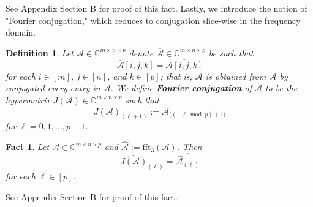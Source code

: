 \documentclass[11pt]{article}
\newtheorem{defn}[theorem]{Definition}
\newtheorem{fact}[theorem]{Fact}
\begin{document}
See Appendix Section B for proof of this fact. Lastly, we introduce the notion of "Fourier conjugation," which reduces to conjugation slice-wise in the frequency domain. 
\begin{defn}\label{Fourier conjugation}
    Let $\mathcal{A}\in \mathbb{C}^{m\times n\times p}$ denote $\overline{\mathcal{A}}\in \mathbb{C}^{m\times n\times p}$ be such that \[\overline{\mathcal{A}}[i,j,k] = \overline{\mathcal{A}[i,j,k]}\]
    for each $i\in [m]$, $j\in [n]$, and $k\in [p]$; that is, $\overline{\mathcal{A}}$ is obtained from $\mathcal{A}$ by conjugated every entry in $\mathcal{A}$. We define \textbf{Fourier conjugation} of $\mathcal{A}$ to be the hypermatrix $J(\mathcal{A})\in \mathbb{C}^{m\times n\times p}$ such that 
    \[J(\mathcal{A})_{(\ell+1)} := \overline{\mathcal{A}_{\big((-\ell\bmod p)+1\big)}}\]
    for $\ell=0,1,...,p-1$. 
\end{defn}
\begin{fact}\label{Fourier conjugation in frequency domain}
    Let $\mathcal{A}\in \mathbb{C}^{m\times n\times p}$ and $\widehat{\mathcal{A}} := \mathrm{fft}_3(\mathcal{A})$. Then 
    \[\widehat{J(\mathcal{A})}_{(\ell)} = \overline{\widehat{\mathcal{A}}_{(\ell)}}\]
    for each $\ell\in [p]$. 
\end{fact}
See Appendix Section B for proof of this fact. 
\end{document}
